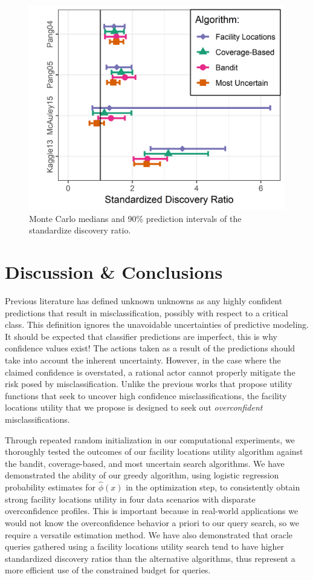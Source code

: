 \documentclass[10pt, conference]{IEEEtran}
\begin{document}
\begin{figure}[hbtp]
  \includegraphics[width=.49\textwidth]{discoveryRatioNarrow.png}
  \caption{Monte Carlo medians and 90\% prediction intervals of the standardize discovery ratio.}
  \label{fig:sdr}
\end{figure}

\section{Discussion \& Conclusions}

Previous literature has defined unknown unknowns as any highly confident predictions that result in misclassification, possibly with respect to a critical class. This definition ignores the unavoidable uncertainties of predictive modeling. It should be expected that classifier predictions are imperfect, this is why confidence values exist! The actions taken as a result of the predictions should take into account the inherent uncertainty. However, in the case where the claimed confidence is overstated, a rational actor cannot properly mitigate the risk posed by misclassification. Unlike the previous works that propose utility functions that seek to uncover high confidence misclassifications, the facility locations utility that we propose is designed to seek out \textit{overconfident} misclassifications. 

Through repeated random initialization in our computational experiments, we thoroughly tested the outcomes of our facility locations utility algorithm against the bandit, coverage-based, and most uncertain search algorithms. We have demonstrated the ability of our greedy algorithm, using logistic regression probability estimates for $\hat{\phi}(x)$ in the optimization step, to consistently obtain strong facility locations utility in four data scenarios with disparate overconfidence profiles. This is important because in real-world applications we would not know the overconfidence behavior a priori to our query search, so we require a versatile estimation method. We have also demonstrated that oracle queries gathered using a facility locations utility search tend to have higher standardized discovery ratios than the alternative algorithms, thus represent a more efficient use of the constrained budget for queries. 
\end{document}

